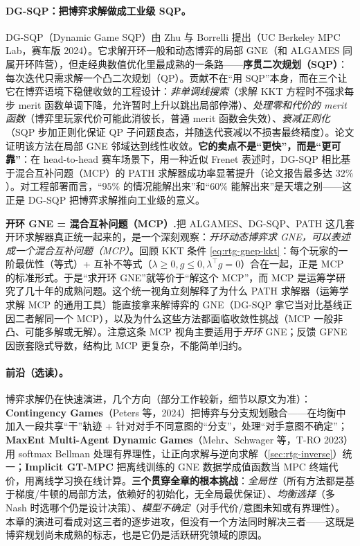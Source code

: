 \paragraph{DG-SQP：把博弈求解做成工业级 SQP。}
DG-SQP（Dynamic Game SQP）由 Zhu 与 Borrelli 提出（UC Berkeley MPC Lab，赛车版 2024）\cite{zhu2024dgsqp}。它求解开环一般和动态博弈的局部 GNE（和 ALGAMES 同属开环阵营），但走经典数值优化里最成熟的一条路——\textbf{序贯二次规划（SQP）}：每次迭代只需求解一个凸二次规划（QP）。贡献不在“用 SQP”本身，而在三个让它在博弈语境下稳健收敛的工程设计：\emph{非单调线搜索}（求解 KKT 方程时不强求每步 merit 函数单调下降，允许暂时上升以跳出局部停滞）、\emph{处理零和代价的 merit 函数}（博弈里玩家代价可能此消彼长，普通 merit 函数会失效）、\emph{衰减正则化}（SQP 步加正则化保证 QP 子问题良态，并随迭代衰减以不损害最终精度）。论文证明该方法在局部 GNE 邻域达到线性收敛。\textbf{它的卖点不是“更快”，而是“更可靠”}：在 head-to-head 赛车场景下，用一种近似 Frenet 表述时，DG-SQP 相比基于混合互补问题（MCP）的 PATH 求解器成功率显著提升（论文报告最多达 $32\%$）\cite{zhu2024dgsqp}。对工程部署而言，“$95\%$ 的情况能解出来”和“$60\%$ 能解出来”是天壤之别——这正是 DG-SQP 把博弈求解推向工业级的意义。

\begin{insight}
\textbf{开环 GNE = 混合互补问题（MCP）.}\;把 ALGAMES、DG-SQP、PATH 这几套开环求解器真正统一起来的，是一个深刻观察：\emph{开环动态博弈求 GNE，可以表述成一个混合互补问题（MCP）}。回顾 KKT 条件 \cref{eq:rtg-gnep-kkt}：每个玩家的一阶最优性（等式）+ 互补不等式（$\lambda\ge0,g\le0,\lambda^\top g=0$）合在一起，正是 MCP 的标准形式。于是“求开环 GNE”就等价于“解这个 MCP”，而 MCP 是运筹学研究了几十年的成熟问题。这个统一视角立刻解释了为什么 PATH 求解器（运筹学求解 MCP 的通用工具）能直接拿来解博弈的 GNE（DG-SQP 拿它当对比基线正因二者解同一个 MCP），以及为什么这些方法都面临收敛性挑战（MCP 一般非凸、可能多解或无解）。注意这条 MCP 视角主要适用于\emph{开环} GNE；反馈 GFNE 因嵌套隐式导数，结构比 MCP 更复杂，不能简单归约。
\end{insight}

\paragraph{前沿（选读）。}
博弈求解仍在快速演进，几个方向（部分工作较新，细节以原文为准）：\textbf{Contingency Games}（Peters 等，2024）把博弈与分支规划融合——在均衡中加入一段共享“干”轨迹 + 针对对手不同意图的“分支”，处理“对手意图不确定”\cite{peters2024contingency}；\textbf{MaxEnt Multi-Agent Dynamic Games}（Mehr、Schwager 等，T-RO 2023）用 softmax Bellman 处理有界理性，让正向求解与逆向求解（\cref{sec:rtg-inverse}）统一\cite{mehr2023maximum}；\textbf{Implicit GT-MPC} 把离线训练的 GNE 数据学成值函数当 MPC 终端代价，用离线学习换在线计算。\textbf{三个贯穿全章的根本挑战}：\emph{全局性}（所有方法都是基于梯度/牛顿的局部方法，依赖好的初始化，无全局最优保证）、\emph{均衡选择}（多 Nash 时选哪个仍是设计决策）、\emph{模型不确定}（对手代价/意图未知或有界理性）。本章的演进可看成对这三者的逐步进攻，但没有一个方法同时解决三者——这既是博弈规划尚未成熟的标志，也是它仍是活跃研究领域的原因。

